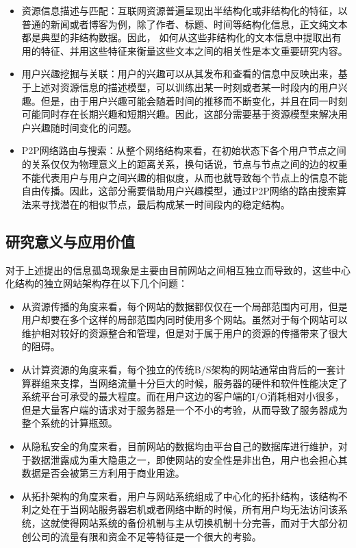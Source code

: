 \begin{itemize}
\item 资源信息描述与匹配：互联网资源普遍呈现出半结构化或非结构化的特征，以普通的新闻或者博客为例，除了作者、标题、时间等结构化信息，正文纯文本都是典型的非结构数据。因此， 如何从这些非结构化的文本信息中提取出有用的特征、并用这些特征来衡量这些文本之间的相关性是本文重要研究内容。
\item 用户兴趣挖掘与关联：用户的兴趣可以从其发布和查看的信息中反映出来，基于上述对资源信息的描述模型，可以训练出某一时刻或者某一时段内的用户兴趣。但是，由于用户兴趣可能会随着时间的推移而不断变化，并且在同一时刻可能同时存在长期兴趣和短期兴趣。因此，这部分需要基于资源模型来解决用户兴趣随时间变化的问题。
\item P2P网络路由与搜索：从整个网络结构来看，在初始状态下各个用户节点之间的关系仅仅为物理意义上的距离关系，换句话说，节点与节点之间的边的权重不能代表用户与用户之间兴趣的相似度，从而也就导致每个节点上的信息不能自由传播。因此，这部分需要借助用户兴趣模型，通过P2P网络的路由搜索算法来寻找潜在的相似节点，最后构成某一时间段内的稳定结构。 
\end{itemize}

\subsection{研究意义与应用价值}
对于上述提出的信息孤岛现象是主要由目前网站之间相互独立而导致的，这些中心化结构的独立网站架构存在以下几个问题：

\begin{itemize}
\item 从资源传播的角度来看，每个网站的数据都仅仅在一个局部范围内可用，但是用户却要在多个这样的局部范围内同时使用多个网站。虽然对于每个网站可以维护相对较好的资源整合和管理，但是对于属于用户的资源的传播带来了很大的阻碍。
\item 从计算资源的角度来看，每个独立的传统B/S架构的网站通常由背后的一套计算群组来支撑，当网络流量十分巨大的时候，服务器的硬件和软件性能决定了系统平台可承受的最大程度。而在用户这边的客户端的I/O消耗相对小很多，但是大量客户端的请求对于服务器是一个不小的考验，从而导致了服务器成为整个系统的计算瓶颈。
\item 从隐私安全的角度来看，目前网站的数据均由平台自己的数据库进行维护，对于数据泄露成为重大隐患之一，即使网站的安全性是非出色，用户也会担心其数据是否会被第三方利用于商业用途。
\item 从拓扑架构的角度来看，用户与网站系统组成了中心化的拓扑结构，该结构不利之处在于当网站服务器宕机或者网络中断的时候，所有用户均无法访问该系统，这就使得网站系统的备份机制与主从切换机制十分完善，而对于大部分初创公司的流量有限和资金不足等特征是一个很大的考验。
\end{itemize}
  
